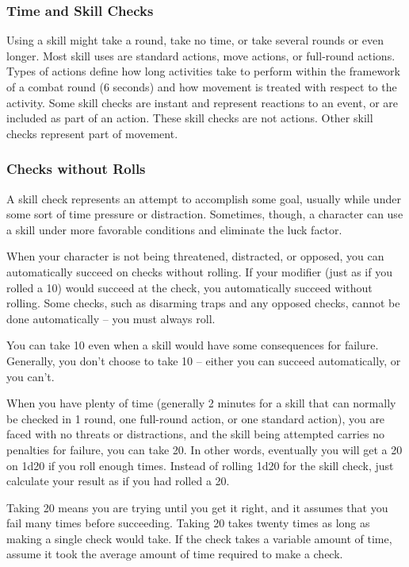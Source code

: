 \subsubsection{Time and Skill Checks}
Using a skill might take a round, take no time, or take several rounds or even longer. Most skill uses are standard actions, move actions, or full-round actions. Types of actions define how long activities take to perform within the framework of a combat round (6 seconds) and how movement is treated with respect to the activity. Some skill checks are instant and represent reactions to an event, or are included as part of an action. These skill checks are not actions. Other skill checks represent part of movement.

\subsubsection{Checks without Rolls}
A skill check represents an attempt to accomplish some goal, usually while under some sort of time pressure or distraction. Sometimes, though, a character can use a skill under more favorable conditions and eliminate the luck factor.

\label{Taking 10} When your character is not being threatened, distracted, or opposed, you can automatically succeed on checks without rolling. If your modifier  (just as if you rolled a 10) would succeed at the check, you automatically succeed without rolling. Some checks, such as disarming traps and any opposed checks, cannot be done automatically -- you must always roll.

You can take 10 even when a skill would have some consequences for failure. Generally, you don't choose to take 10 -- either you can succeed automatically, or you can't.

 When you have plenty of time (generally 2 minutes for a skill that can normally be checked in 1 round, one full-round action, or one standard action), you are faced with no threats or distractions, and the skill being attempted carries no penalties for failure, you can take 20. In other words, eventually you will get a 20 on 1d20 if you roll enough times. Instead of rolling 1d20 for the skill check, just calculate your result as if you had rolled a 20.

Taking 20 means you are trying until you get it right, and it assumes that you fail many times before succeeding. Taking 20 takes twenty times as long as making a single check would take. If the check takes a variable amount of time, assume it took the average amount of time required to make a check.

